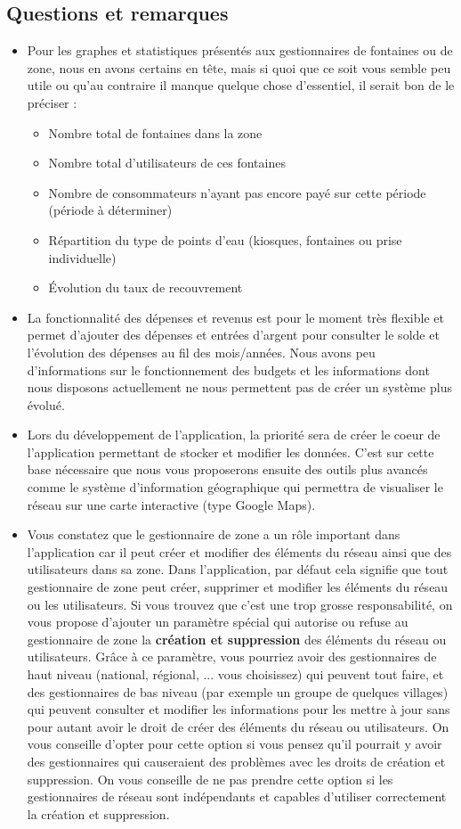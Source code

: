\documentclass[a4paper, 11pt]{article}
\begin{document}
  \subsection{Questions et remarques}
  \begin{itemize}
    \item Pour les graphes et statistiques présentés aux gestionnaires de fontaines ou de zone, nous en avons certains en tête, mais si quoi que ce soit vous semble peu utile ou qu'au contraire il manque quelque chose d'essentiel, il serait bon de le préciser :
    \begin{itemize}
      \item Nombre total de fontaines dans la zone
      \item Nombre total d'utilisateurs de ces fontaines
      \item Nombre de consommateurs n'ayant pas encore payé sur cette période (période à déterminer)
      \item Répartition du type de points d'eau (kiosques, fontaines ou prise individuelle)
      \item Évolution du taux de recouvrement
    \end{itemize}
    \item La fonctionnalité des dépenses et revenus est pour le moment très flexible et permet d'ajouter des dépenses et entrées d'argent pour consulter le solde et l'évolution des dépenses au fil des mois/années. Nous avons peu d'informations sur le fonctionnement des budgets et les informations dont nous disposons actuellement ne nous permettent pas de créer un système plus évolué.
    \item Lors du développement de l'application, la priorité sera de créer le coeur de l'application permettant de stocker et modifier les données. C'est sur cette base nécessaire que nous vous proposerons ensuite des outils plus avancés comme le système d'information géographique qui permettra de visualiser le réseau sur une carte interactive (type Google Maps).
    \item Vous constatez que le gestionnaire de zone a un rôle important dans l'application car il peut créer et modifier des éléments du réseau ainsi que des utilisateurs dans sa zone. Dans l'application, par défaut cela signifie que tout gestionnaire de zone peut créer, supprimer et modifier les éléments du réseau ou les utilisateurs. Si vous trouvez que c'est une trop grosse responsabilité, on vous propose d'ajouter un paramètre spécial qui autorise ou refuse au gestionnaire de zone la \textbf{création et suppression} des éléments du réseau ou utilisateurs. Grâce à ce paramètre, vous pourriez avoir des gestionnaires de haut niveau (national, régional, ... vous choisissez) qui peuvent tout faire, et des gestionnaires de bas niveau (par exemple un groupe de quelques villages) qui peuvent consulter et modifier les informations pour les mettre à jour sans pour autant avoir le droit de créer des éléments du réseau ou utilisateurs. On vous conseille d'opter pour cette option si vous pensez qu'il pourrait y avoir des gestionnaires qui causeraient des problèmes avec les droits de création et suppression. On vous conseille de ne pas prendre cette option si les gestionnaires de réseau sont indépendants et capables d'utiliser correctement la création et suppression.

\end{itemize}
\end{document}
